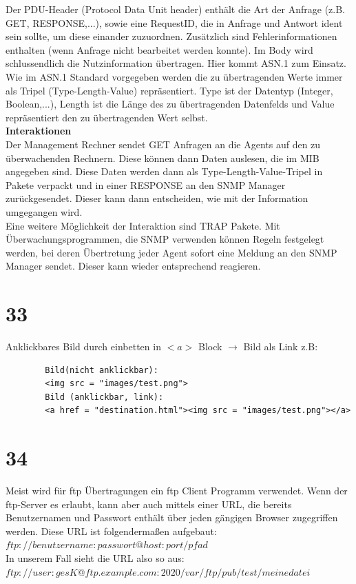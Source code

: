\documentclass[12pt, a4paper]{article}
\begin{document}
	Der PDU-Header (Protocol Data Unit header) enthält die Art der Anfrage (z.B. GET, RESPONSE,...), sowie eine RequestID, die in Anfrage und Antwort ident sein sollte, um diese einander zuzuordnen.
	Zusätzlich sind Fehlerinformationen enthalten (wenn Anfrage nicht bearbeitet werden konnte).
	Im Body wird schlussendlich die Nutzinformation übertragen. Hier kommt ASN.1 zum Einsatz. Wie im ASN.1 Standard vorgegeben werden die zu übertragenden Werte immer als Tripel (Type-Length-Value) repräsentiert. Type ist der Datentyp (Integer, Boolean,...), Length ist die Länge des zu übertragenden Datenfelds und Value repräsentiert den zu übertragenden Wert selbst.
	\\
	\textbf{Interaktionen}\\
	Der Management Rechner sendet GET Anfragen an die Agents auf den zu überwachenden Rechnern. Diese können dann Daten auslesen, die im MIB angegeben sind. Diese Daten werden dann als Type-Length-Value-Tripel in Pakete verpackt und in einer RESPONSE an den SNMP Manager zurückgesendet. Dieser kann dann entscheiden, wie mit der Information umgegangen wird.\\
	Eine weitere Möglichkeit der Interaktion sind TRAP Pakete. Mit Überwachungsprogrammen, die SNMP verwenden können Regeln festgelegt werden, bei deren Übertretung jeder Agent sofort eine Meldung an den SNMP Manager sendet. Dieser kann wieder entsprechend reagieren.
	


\section*{33}
	Anklickbares Bild durch einbetten in $<a>$ Block $\rightarrow$ Bild als Link z.B:
	\begin{verbatim}
		Bild(nicht anklickbar):
		<img src = "images/test.png">
		Bild (anklickbar, link):
		<a href = "destination.html"><img src = "images/test.png"></a>
	\end{verbatim}
	
		
\section*{34}
	Meist wird für ftp Übertragungen ein ftp Client Programm verwendet. Wenn der ftp-Server es erlaubt, kann aber auch
	mittels einer URL, die bereits Benutzernamen und Passwort enthält über jeden gängigen Browser zugegriffen werden.
	Diese URL ist folgendermaßen aufgebaut:\\
	$ftp://benutzername:passwort@host:port/pfad$\\
	In unserem Fall sieht die URL also so aus:\\
	$ftp://user:gesK@ftp.example.com:2020/var/ftp/pub/test/meinedatei$
	
\end{document}
